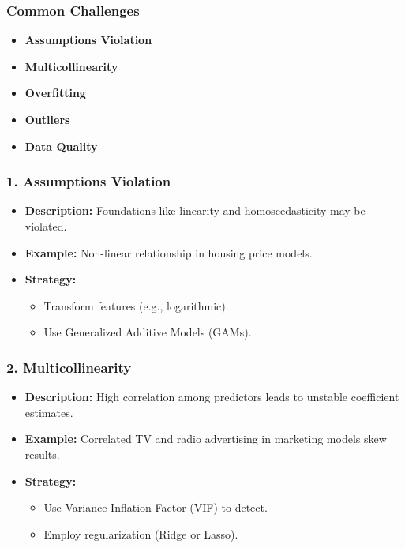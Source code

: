 \documentclass[aspectratio=169]{beamer}
\begin{document}
\begin{frame}[fragile]
    \frametitle{Common Challenges}
    \begin{itemize}
        \item \textbf{Assumptions Violation}
        \item \textbf{Multicollinearity}
        \item \textbf{Overfitting}
        \item \textbf{Outliers}
        \item \textbf{Data Quality}
    \end{itemize}
\end{frame}

\begin{frame}[fragile]
    \frametitle{1. Assumptions Violation}
    \begin{itemize}
        \item \textbf{Description:} Foundations like linearity and homoscedasticity may be violated.
        \item \textbf{Example:} Non-linear relationship in housing price models.
        \item \textbf{Strategy:}
        \begin{itemize}
            \item Transform features (e.g., logarithmic).
            \item Use Generalized Additive Models (GAMs).
        \end{itemize}
    \end{itemize}
\end{frame}

\begin{frame}[fragile]
    \frametitle{2. Multicollinearity}
    \begin{itemize}
        \item \textbf{Description:} High correlation among predictors leads to unstable coefficient estimates.
        \item \textbf{Example:} Correlated TV and radio advertising in marketing models skew results.
        \item \textbf{Strategy:}
        \begin{itemize}
            \item Use Variance Inflation Factor (VIF) to detect.
            \item Employ regularization (Ridge or Lasso).
        \end{itemize}
    \end{itemize}
\end{frame}
\end{document}

